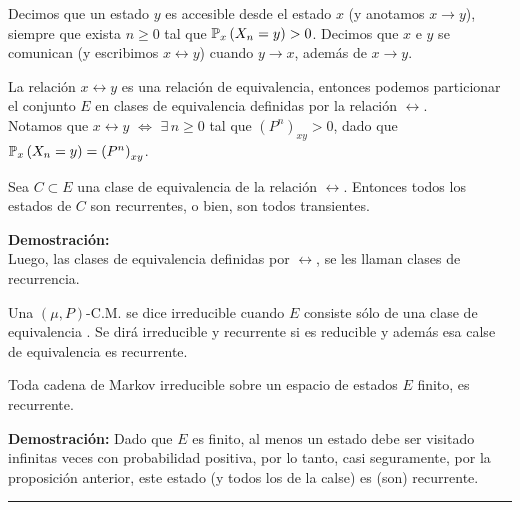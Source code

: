 \begin{definicion}
Decimos que un estado $y$ es accesible desde el estado $x$ (y anotamos $x\rightarrow y$), siempre que exista $n\geq 0$ tal que $\mathbb{P}_x\left(X_n=y\right)>0$. Decimos que $x$ e $y$ se comunican (y escribimos $x\leftrightarrow y$) cuando $y\rightarrow x$,  además de $x\rightarrow y$. 
\end{definicion}

La relación $x\leftrightarrow y$ es una relación de equivalencia, entonces podemos particionar el conjunto $E$ en clases de equivalencia definidas por la relación $\leftrightarrow$.\\
Notamos que $x\leftrightarrow y$ $\Longleftrightarrow$ $\exists\,n\geq 0$ tal que $\left(P^n\right)_{xy}>0$, dado que $\mathbb{P}_x\left(X_n=y\right)=\left(P^n\right)_{xy}$.  \\ \newline

\begin{teorema}
Sea $C\subset E$ una clase de equivalencia de la relación $\leftrightarrow$. Entonces todos los estados de $C$ son recurrentes, o bien, son todos transientes.
\end{teorema}

\textbf{Demostración: }\cite[págs. 26- Teo.4.5]{Pard}\\ \newline
Luego, las clases de equivalencia definidas por $\leftrightarrow$, se les llaman clases de recurrencia.

\begin{definicion}
Una $(\mu,P)$-C.M. se dice irreducible cuando $E$ consiste sólo de una clase de equivalencia . Se dirá irreducible y recurrente si es reducible y además esa calse de equivalencia es  recurrente.
\end{definicion}

\begin{prop}
Toda cadena de Markov irreducible sobre un espacio de estados $E$ finito, es recurrente.
\end{prop}

\textbf{Demostración: }Dado que $E$ es finito, al menos un estado debe ser visitado infinitas veces con probabilidad positiva, por lo tanto,  casi seguramente, por la proposición anterior, este estado (y todos los de la calse) es (son) recurrente.\\
\rule{0.7em}{0.7em}\\ \newline

